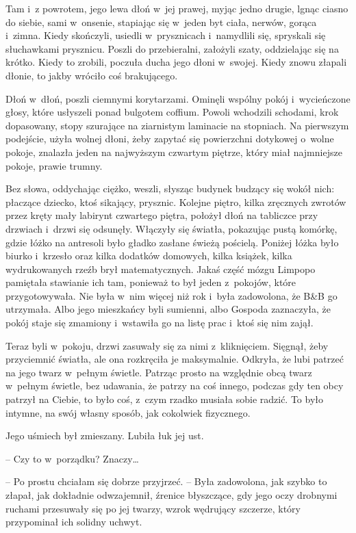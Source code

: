 \documentclass[oneside,polish,11pt,sfheadings]{mwbk}
\begin{document}
Tam i~z powrotem, jego lewa dłoń w~jej prawej, myjąc jedno drugie, lgnąc
ciasno do siebie, sami w~onsenie, stapiając się w~jeden byt ciała,
nerwów, gorąca i~zimna. Kiedy skończyli, usiedli w~prysznicach i~namydlili się, spryskali się słuchawkami prysznicu. Poszli do
przebieralni, założyli szaty, oddzielając się na krótko. Kiedy to
zrobili, poczuła ducha jego dłoni w~swojej. Kiedy znowu złapali dłonie,
to jakby wróciło coś brakującego.

Dłoń w~dłoń, poszli ciemnymi korytarzami. Ominęli wspólny pokój i~wycieńczone głosy, które usłyszeli ponad bulgotem coffium. Powoli
wchodzili schodami, krok dopasowany, stopy szurające na ziarnistym
laminacie na stopniach. Na pierwszym podejście, użyła wolnej dłoni, żeby
zapytać się powierzchni dotykowej o~wolne pokoje, znalazła jeden na
najwyższym czwartym piętrze, który miał najmniejsze pokoje, prawie
trumny.

Bez słowa, oddychając ciężko, weszli, słysząc budynek budzący się wokół
nich: płaczące dziecko, ktoś sikający, prysznic. Kolejne piętro, kilka
zręcznych zwrotów przez kręty mały labirynt czwartego piętra, położył
dłoń na tabliczce przy drzwiach i~drzwi się odsunęły. Włączyły się
światła, pokazując pustą komórkę, gdzie łóżko na antresoli było gładko
zasłane świeżą pościelą. Poniżej łóżka było biurko i~krzesło oraz kilka
dodatków domowych, kilka książek, kilka wydrukowanych rzeźb brył
matematycznych. Jakaś część mózgu Limpopo pamiętała stawianie ich tam,
ponieważ to był jeden z~pokojów, które przygotowywała. Nie była w~nim
więcej niż rok i~była zadowolona, że B\&B go utrzymała. Albo jego
mieszkańcy byli sumienni, albo Gospoda zaznaczyła, że pokój staje się
zmamiony i~wstawiła go na listę prac i~ktoś się nim zajął.

Teraz byli w~pokoju, drzwi zasuwały się za nimi z~kliknięciem. Sięgnął,
żeby przyciemnić światła, ale ona rozkręciła je maksymalnie. Odkryła, że
lubi patrzeć na jego twarz w~pełnym świetle. Patrząc prosto na względnie
obcą twarz w~pełnym świetle, bez udawania, że patrzy na coś innego,
podczas gdy ten obcy patrzył na Ciebie, to było coś, z~czym rzadko
musiała sobie radzić. To było intymne, na swój własny sposób, jak
cokolwiek fizycznego.

Jego uśmiech był zmieszany. Lubiła łuk jej ust.

-- Czy to w~porządku? Znaczy\ldots 

-- Po prostu chciałam się dobrze przyjrzeć. -- Była zadowolona, jak szybko
to złapał, jak dokładnie odwzajemnił, źrenice błyszczące, gdy jego oczy
drobnymi ruchami przesuwały się po jej twarzy, wzrok wędrujący szczerze,
który przypominał ich solidny uchwyt.
\end{document}
